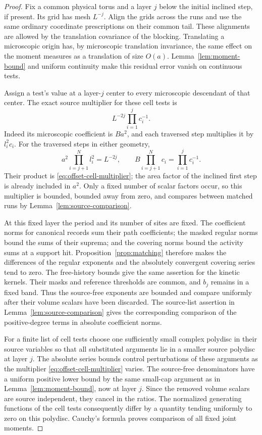 \begin{proof}
Fix a common physical torus and a layer $j$ below the initial inclined
step, if present.  Its grid has mesh $L^{-j}$.  Align the grids across
the runs and use the same ordinary coordinate prescriptions on their
common tail.  These alignments are allowed by the translation covariance
of the blocking.  Translating a microscopic origin has, by microscopic
translation invariance, the same effect on the moment measures as a
translation of size $O(a)$.  Lemma~\ref{lem:moment-bound} and uniform
continuity make this residual error vanish on continuous tests.

Assign a test's value at a layer-$j$ center to every microscopic
descendant of that center.  The exact source multiplier for these cell
tests is
\begin{equation}
 L^{-2j}\prod_{i=1}^j c_i^{-1}.
 \label{eq:offset-cell-multiplier}
\end{equation}
Indeed its microscopic coefficient is $Ba^2$, and each traversed step
multiplies it by $l_i^2c_i$.  For the traversed steps in either geometry,
\[
 a^2\prod_{i=j+1}^N l_i^2=L^{-2j},\qquad
 B\prod_{i=j+1}^N c_i=\prod_{i=1}^j c_i^{-1}.
\]
Their product is \eqref{eq:offset-cell-multiplier}; the area factor of
the inclined first step is already included in $a^2$.
Only a fixed number of scalar factors occur, so this multiplier is
bounded, bounded away from zero, and compares between matched runs by
Lemma~\ref{lem:source-comparison}.

At this fixed layer the period and its number of sites are fixed.
The coefficient norms for canonical records sum their path
coefficients; the masked regular norms bound the sums of their
suprema; and the covering norms bound the activity sums at a support
hit.  Proposition~\ref{prop:matching} therefore makes the differences
of the regular exponents and the absolutely convergent covering series
tend to zero.  The free-history bounds give the same assertion for
the kinetic kernels.  Their masks and reference thresholds are common,
and $b_j$ remains in a fixed band.  Thus the source-free exponents
are bounded and compare uniformly after their volume scalars have
been discarded.  The source-list assertion in
Lemma~\ref{lem:source-comparison} gives the corresponding comparison
of the positive-degree terms in absolute coefficient norms.

For a finite list of cell tests choose one sufficiently small complex
polydisc in their source variables so that all substituted arguments
lie in a smaller source polydisc at layer $j$.  The absolute series
bounds control perturbations of these arguments as the multiplier
\eqref{eq:offset-cell-multiplier} varies.  The source-free denominators
have a uniform positive lower bound by the same small-cap argument
as in Lemma~\ref{lem:moment-bound}, now at layer $j$.  Since the removed
volume scalars are source independent, they cancel in the ratios.
The normalized generating functions of the cell tests consequently
differ by a quantity tending uniformly to zero on this polydisc.
Cauchy's formula proves comparison of all fixed joint moments.


\end{proof}
